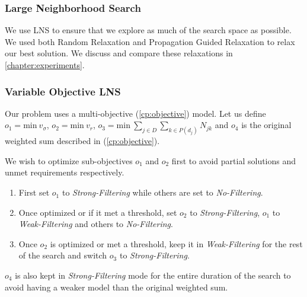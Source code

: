 \documentclass[../../thesis.tex]{subfiles}
\begin{document}
\subsubsection{Large Neighborhood Search}

We use LNS to ensure that we explore as much of the search space as possible. 
We used both Random Relaxation and Propagation Guided Relaxation \cite{Propagation:LNS} to relax 
our best solution. We discuss and compare these relaxations in \autoref{chapter:experiments}.


\subsubsection{Variable Objective LNS}
\label{cp:volns}

Our problem uses a multi-objective (\ref{cp:objective}) model. 
Let us define $o_1 = \text{min} \ v_{\sigma}$, $o_2 = {\text{min} \ v_r}$, $o_3 = {\text{min} \ \sum_{j \in D} \sum_{k \in P(d_j)} N_{jk}}$
and $o_4$ is the original weighted sum described in (\ref{cp:objective}).


We wish to optimize sub-objectives $o_1$ and $o_2$ first to avoid partial solutions and unmet requirements respectively. 

\begin{enumerate}
  \item First set $o_1$ to \emph{Strong-Filtering} while others are set to \emph{No-Filtering}.
  \item Once optimized or if it met a threshold, set $o_2$ to \emph{Strong-Filtering}, $o_1$ to \emph{Weak-Filtering} and others to \emph{No-Filtering}.
  \item Once $o_2$ is optimized or met a threshold, keep it in \emph{Weak-Filtering} for the rest of the search and switch $o_3$ to \emph{Strong-Filtering}.
\end{enumerate}

$o_4$ is also kept in \emph{Strong-Filtering} mode for the entire duration of the search to avoid having a weaker model than the original weighted sum.
\end{document}
